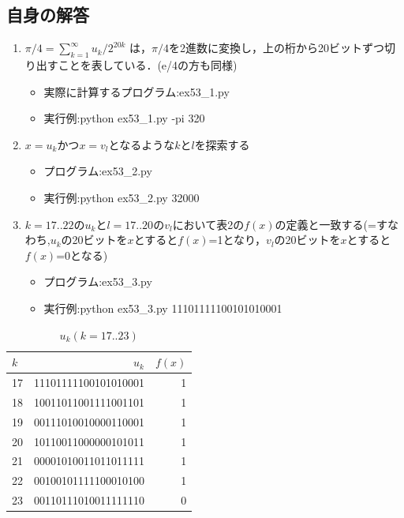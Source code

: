 \documentclass[dvipdfmx,a4paper,12pt]{jsarticle}
\begin{document}
 \subsection*{自身の解答}
 \begin{enumerate}
 
\item  $π/4 = \sum_{k=1}^\infty u_{k}/2^{20k}$ は，$π/4$を2進数に変換し，上の桁から20ビットずつ切り出すことを表している．(e/4の方も同様)
 
\begin{itemize}
\item 実際に計算するプログラム:ex53\_1.py
\item 実行例:python ex53\_1.py -pi 320
\end{itemize}

\item $x=u_{k}$かつ$x=v_{l}$となるような$k$と$l$を探索する
\begin{itemize}
\item プログラム:ex53\_2.py
\item 実行例:python ex53\_2.py 32000
\end{itemize}

\item  $k=17..22$の$u_{k}$と$l=17..20$の$v_{l}$において表2の$f(x)$の定義と一致する(=すなわち,$u_{k}$の20ビットを$x$とすると$f(x)$=1となり，$v_{l}$の20ビットを$x$とすると$f(x)$=0となる)

\begin{itemize}
\item プログラム:ex53\_3.py
\item 実行例:python ex53\_3.py 11101111100101010001
\end{itemize}




 \end{enumerate}
 
  \begin{table}[h]
 \caption{$u_{k}(k=17..23)$}
 {\scriptsize
 \hspace{4cm}
 \begin{tabular}{l|r|r}
 $k$ & $u_{k}$ & $f(x)$  \\ \hline
 17 & 11101111100101010001 & 1 \\
 18 &10011011001111001101 & 1\\
19 &00111010010000110001 &1 \\
20 &10110011000000101011&1\\
21 &00001010011011011111&1\\
22 &00100101111100010100&1\\
23 &00110111010011111110&0\\
\end{tabular}
 }
 \end{table}
 
\end{document}
